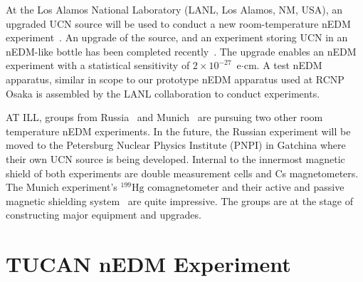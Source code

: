 At the Los Alamos National Laboratory (LANL, Los Alamos, NM, USA), an upgraded UCN source will be used to conduct a new room-temperature nEDM experiment~\cite{lanl_nEDM-workshop}. An upgrade of the source, and an experiment storing UCN in an nEDM-like bottle has been completed recently~\cite{sns_nEDM-workshop2,sns2}. The upgrade enables an nEDM experiment with a statistical sensitivity of $2\times10^{-27}$~e$\cdot$cm. A test nEDM apparatus, similar in scope to our prototype nEDM apparatus used at RCNP Osaka is assembled by the LANL collaboration to conduct experiments.





AT ILL, groups from Russia~\cite{pnpi_nEDM-workshop} and Munich~\cite{ill2_nEDM-workshop} are pursuing two other room temperature nEDM experiments. In the future, the Russian experiment will be moved to the Petersburg Nuclear Physics Institute (PNPI) in Gatchina where their own UCN source is being developed. Internal to the innermost magnetic shield of both experiments are double measurement cells and Cs magnetometers. The Munich experiment's $^{199}\mathrm{Hg}$ comagnetometer and their active and passive magnetic shielding system~\cite{mu_msr_1,shield_pnpi,shield_pnpi2} are quite impressive. The groups are at the stage of constructing major equipment and upgrades.

\section{TUCAN nEDM Experiment}



